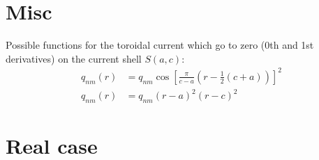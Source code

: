 \documentclass{article}
\begin{document}
\section{Misc}

Possible functions for the toroidal current which go to zero (0th and 1st
derivatives) on the current shell $S(a,c)$:
\begin{align}
q_{nm}(r) &= q_{nm} \cos{\left[ \frac{\pi}{c-a} \left( r - \frac{1}{2}(c+a) \right) \right]}^2 \\
q_{nm}(r) &= q_{nm} (r-a)^2 (r-c)^2
\end{align}

\section{Real case}
\end{document}
